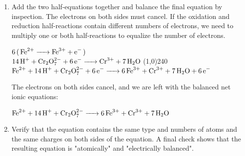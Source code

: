 \documentclass[a4paper,12pt,twocolumn]{article}
\begin{document}
\begin{enumerate}
    \item Add the two half-equations together and balance the final equation by inspection. The electrons on both sides must cancel. If the oxidation and reduction half-reactions contain different numbers of electrons, we need to multiply one or both half-reactions to equalize the number of electrons.
    \\
    \begin{center}
    $\ce{6( Fe^{2+} -> Fe^{3+} + e^- )}$\\
    $\ce{14H^+ + Cr2O^{2-}7 + 6e^- -> Cr^{3+} + 7H2O}$
    \line(1,0){240}\\
    $\ce{Fe^{2+} + 14H^+ + Cr2O^{2-}7 + 6e^- -> 6Fe^{3+} + Cr^{3+} + 7H2O + 6e^-}$
    \end{center}
    The electrons on both sides cancel, and we are left with the balanced net ionic equations:
    \begin{center}
        $\ce{Fe^{2+} + 14H^+ + Cr2O^{2-}7 -> 6Fe^{3+} + Cr^{3+} + 7H2O}$
    \end{center}
    \item Verify that the equation contains the same type and numbers of atoms and the same charges on both sides of the equation.
    A final check shows that the resulting  equation is "atomically" and "electrically balanced".
\end{enumerate}
\end{document}
